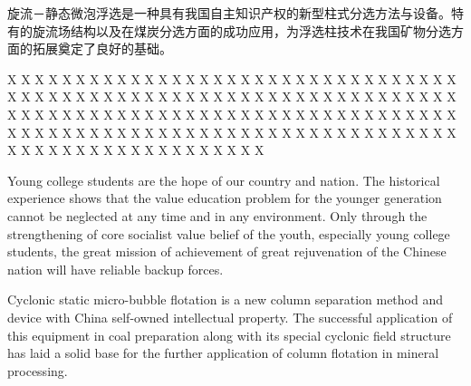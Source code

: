 \begin{cnabstract}
	旋流－静态微泡浮选是一种具有我国自主知识产权的新型柱式分选方法与设备。特有的旋流场结构以及在煤炭分选方面的成功应用，为浮选柱技术在我国矿物分选方面的拓展奠定了良好的基础。

	X X X X X X X X X X X X X X X X X X X X X X X X X X X X X X X X X X X X X X X X X X X X X X X X X X X X X X X X X X X X X X X X X X X X X X X X X X X X X X X X X X X X X X X X X X X X X X X X X X X X X X X X X X X X X X X X X X X X X X X X X X X X X X X X X X X X X X X X X X X X X X X X X X X X X X X 

\end{cnabstract}


\begin{enabstract}
	Young college students are the hope of our country and nation. The historical experience shows that the value education problem for the younger generation cannot be neglected at any time and in any environment. Only through the strengthening of core socialist value belief of the youth, especially young college students, the great mission of achievement of great rejuvenation of the Chinese nation will have reliable backup forces.

	Cyclonic static micro-bubble flotation is a new column separation method and device with China self-owned intellectual property.  The successful application of this equipment in coal preparation along with its special cyclonic field structure has laid a solid base for the further application of column flotation in mineral processing.

\end{enabstract}